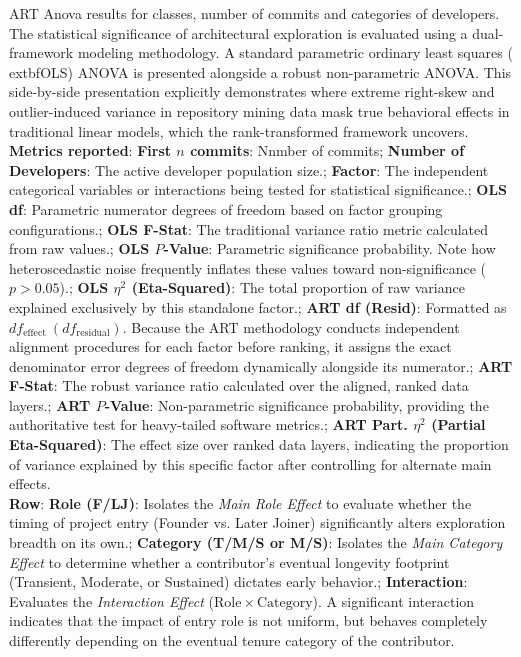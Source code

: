 \begin{landscape}
\begin{table}[H]
\centering
\setlength{\tabcolsep}{2pt}
\caption[ART Anova for all classes]{ART Anova results for classes, number of commits and categories of developers. The statistical significance of architectural exploration is evaluated using a dual-framework modeling methodology. A standard parametric ordinary least squares (	extbf{OLS}) ANOVA is presented alongside a robust non-parametric ANOVA. This side-by-side presentation explicitly demonstrates where extreme right-skew and outlier-induced variance in repository mining data mask true behavioral effects in traditional linear models, which the rank-transformed framework uncovers.\\ \textbf{Metrics reported}:   \textbf{First $n$ commits}: Nnmber of commits;  \textbf{Number of Developers}: The active developer population size.;  \textbf{Factor}: The independent categorical variables or interactions being tested for statistical significance.;  \textbf{OLS df}: Parametric numerator degrees of freedom based on factor grouping configurations.;  \textbf{OLS F-Stat}: The traditional variance ratio metric calculated from raw values.;  \textbf{OLS $P$-Value}: Parametric significance probability. Note how heteroscedastic noise frequently inflates these values toward non-significance ($p > 0.05$).;  \textbf{OLS $\eta^2$ (Eta-Squared)}: The total proportion of raw variance explained exclusively by this standalone factor.;  \textbf{ART df (Resid)}: Formatted as $df_{\mathrm{effect}}~(df_{\mathrm{residual}})$. Because the ART methodology conducts independent alignment procedures for each factor before ranking, it assigns the exact denominator error degrees of freedom dynamically alongside its numerator.;  \textbf{ART F-Stat}: The robust variance ratio calculated over the aligned, ranked data layers.;  \textbf{ART $P$-Value}: Non-parametric significance probability, providing the authoritative test for heavy-tailed software metrics.;  \textbf{ART Part. $\eta^2$ (Partial Eta-Squared)}: The effect size over ranked data layers, indicating the proportion of variance explained by this specific factor after controlling for alternate main effects.
\\ \textbf{Row}:   \textbf{Role (F/LJ)}: Isolates the \textit{Main Role Effect} to evaluate whether the timing of project entry (Founder vs. Later Joiner) significantly alters exploration breadth on its own.;  \textbf{Category (T/M/S or M/S)}: Isolates the \textit{Main Category Effect} to determine whether a contributor's eventual longevity footprint (Transient, Moderate, or Sustained) dictates early behavior.;  \textbf{Interaction}: Evaluates the \textit{Interaction Effect} ($\mathrm{Role} \times \mathrm{Category}$). A significant interaction indicates that the impact of entry role is not uniform, but behaves completely differently depending on the eventual tenure category of the contributor.
}
\end{table}
\end{landscape}
